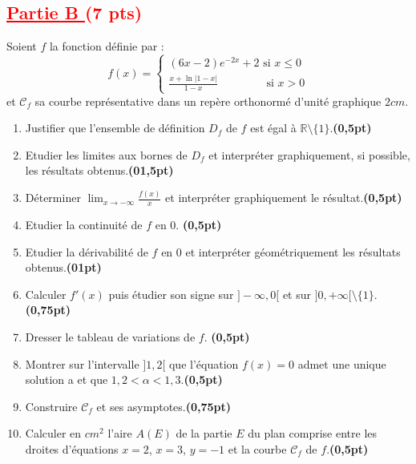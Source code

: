 \documentclass[12pt]{article}
\begin{document}
\subsection*{\textcolor{red}{\underline{Partie B }(7 pts)}}
Soient $f$ la fonction définie par :
\[
f(x)=
\begin{cases}
(6x-2)e^{-2x}+2 \text{ si } x\leq 0 \\
\frac{x+\ln|1-x|}{1-x} \quad\quad\quad\quad\text{ si } x > 0
\end{cases}
\]
et $\mathscr{C}_{f}$ sa courbe représentative dans un repère orthonormé d'unité graphique $2cm$.
\begin{enumerate}
    \item Justifier que l'ensemble de définition $D_{f}$ de $f$ est égal à $\mathbb{R}\setminus\{1\}$.\hfill \textbf{(0,5pt)}
    \item Etudier les limites aux bornes de $D_{f}$ et interpréter graphiquement, si possible, les résultats obtenus.\hfill \textbf{(01,5pt)}
    \item Déterminer $\lim_{x\to -\infty}\frac{f(x)}{x}$ et interpréter graphiquement le résultat.\hfill \textbf{(0,5pt)}
    \item Etudier la continuité de $f$ en 0.\> \hfill \textbf{(0,5pt)}
    \item Etudier la dérivabilité de $f$ en 0 et interpréter géométriquement les résultats obtenus.\hfill \textbf{(01pt)}
    \item Calculer $f'(x)$ puis étudier son signe sur $]-\infty, 0[$ et sur $]0, +\infty[\setminus\{1\}$.\hfill \textbf{(0,75pt)}
    \item Dresser le tableau de variations de $f$. \hfill \textbf{(0,5pt)}
    \item Montrer sur l'intervalle $]1, 2[$ que l'équation $f(x) = 0$ admet une unique solution a et que $1,2 < \alpha < 1,3$.\hfill \textbf{(0,5pt)}
    \item Construire $\mathscr{C}_{f}$ et ses asymptotes.\hfill \textbf{(0,75pt)}
    \item Calculer en $cm^{2}$ l'aire $A(E)$ de la partie $E$ du plan comprise entre les droites d'équations $x = 2$, $x = 3$, $y = -1$ et la courbe $\mathscr{C}_{f}$ de $f$.\hfill \textbf{(0,5pt)}
\end{enumerate}
\end{document}
